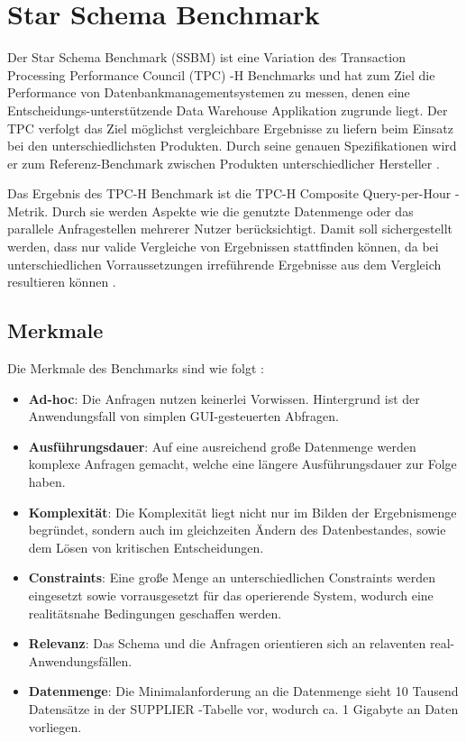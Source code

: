 \chapter{Star Schema Benchmark}

Der Star Schema Benchmark (SSBM) ist eine Variation des Transaction Processing Performance Council (TPC) -H Benchmarks und hat zum Ziel die Performance von Datenbankmanagementsystemen zu messen, denen eine Entscheidungs-unterstützende Data Warehouse Applikation zugrunde liegt. Der TPC verfolgt das Ziel möglichst vergleichbare Ergebnisse zu liefern beim Einsatz bei den unterschiedlichsten Produkten. Durch seine genauen  Spezifikationen wird er zum Referenz-Benchmark zwischen Produkten unterschiedlicher Hersteller \cite[vgl.][]{tpch2}. 

Das Ergebnis des TPC-H Benchmark ist die {\glqq}TPC-H Composite Query-per-Hour{\grqq} -Metrik. Durch sie werden Aspekte wie die genutzte Datenmenge oder das parallele Anfragestellen mehrerer Nutzer berücksichtigt. Damit soll sichergestellt werden, dass nur valide Vergleiche von Ergebnissen stattfinden können, da bei unterschiedlichen Vorraussetzungen irreführende Ergebnisse aus dem Vergleich resultieren können \cite[vgl.][]{tpch2}. 

\section{Merkmale}
Die Merkmale des Benchmarks sind wie folgt \cite[vgl.][]{tpch3}: 
\begin{itemize}
	\item \textbf{Ad-hoc}: Die Anfragen nutzen keinerlei Vorwissen. Hintergrund ist der Anwendungsfall von simplen GUI-gesteuerten Abfragen. 
	\item \textbf{Ausführungsdauer}: Auf eine ausreichend große Datenmenge werden komplexe Anfragen gemacht, welche eine längere Ausführungsdauer zur Folge haben. 
	\item \textbf{Komplexität}: Die Komplexität liegt nicht nur im Bilden der Ergebnismenge begründet, sondern auch im gleichzeiten Ändern des Datenbestandes, sowie dem Lösen von kritischen Entscheidungen. 
	\item \textbf{Constraints}: Eine große Menge an unterschiedlichen Constraints werden eingesetzt sowie vorrausgesetzt für das operierende System, wodurch eine realitätsnahe Bedingungen geschaffen werden. 
	\item \textbf{Relevanz}: Das Schema und die Anfragen orientieren sich an relaventen real-Anwendungsfällen. 
	\item \textbf{Datenmenge}: Die Minimalanforderung an die Datenmenge sieht 10 Tausend Datensätze in der {\glqq}SUPPLIER{\grqq} -Tabelle vor, wodurch ca. 1 Gigabyte an Daten vorliegen. 
\end{itemize}

